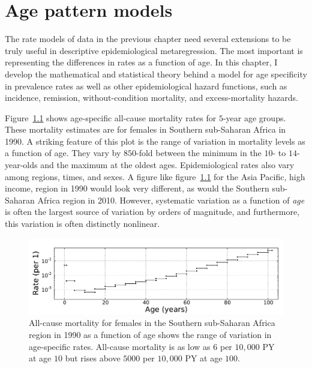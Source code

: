 \chapter{Age pattern models}
\label{theory-age_pattern_model}
The rate models of data in the previous chapter need several
extensions to be truly useful in descriptive epidemiological
metaregression.  The most important is representing the differences in
rates as a function of age.  In this chapter, I develop the
mathematical and statistical theory behind a model for age specificity
in prevalence rates as well as other epidemiological hazard functions,
such as incidence, remission, without-condition mortality, and
excess-mortality hazards.

Figure~\ref{ssas-mx_female_1990} shows age-specific all-cause
mortality rates for $5$-year age groups.  These mortality estimates are
for females in Southern sub-Saharan Africa in 1990.  A striking
feature of this plot is the range of variation in mortality levels as
a function of age.  They vary by $850$-fold between the minimum
in the $10$- to $14$-year-olds and the maximum at the oldest
ages. Epidemiological rates also vary among regions, times, and
sexes.  A figure like figure~\ref{ssas-mx_female_1990} for the Asia Pacific,
high income, region in 1990 would look very different, as
would the Southern sub-Saharan Africa region in 2010. However,
systematic variation as a function of \emph{age} is often the largest
source of variation by orders of magnitude, and furthermore, this
variation is often distinctly nonlinear.

\begin{figure}[h]
\begin{center}
\includegraphics[width=\textwidth]{ssas-mx_female_1990.pdf}
\caption[All-cause mortality as a function of age.]{All-cause mortality for
  females in the Southern sub-Saharan Africa
  region in 1990 as a function of age shows the range of
  variation in age-specific rates.  All-cause mortality is as low as $6$ per
  $10,000$ PY at age $10$ but rises above $5000$ per $10,000$ PY at age $100$.}
\label{ssas-mx_female_1990}
\end{center}
\end{figure}

